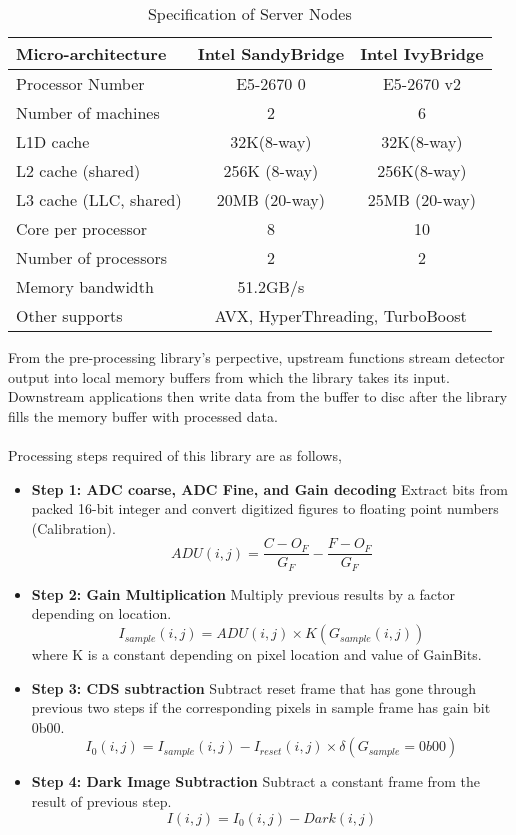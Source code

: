 \documentclass[journal]{IEEEtran}
\begin{document}
\begin{table}[h]
\centering
\label{servers}
\begin{tabular}{l | c c}
\hline
Micro-architecture & Intel SandyBridge & Intel IvyBridge \\
\hline
Processor Number& 	E5-2670 0	& E5-2670 v2 \\
Number of machines&	2		& 6	\\
L1D cache	&	32K(8-way)		& 32K(8-way) \\
L2 cache (shared)  &	256K	(8-way)	& 256K(8-way) \\
L3 cache (LLC, shared)	&	20MB (20-way)	& 25MB (20-way) \\
Core per processor  &	8		& 10	\\
Number of processors  &	2		& 2	\\
Memory bandwidth    &51.2GB/s       & \\
\hline
Other supports  & 
\multicolumn{2}{|c}{AVX, HyperThreading, TurboBoost}  	\\
\hline
\end{tabular}
\caption{Specification of Server Nodes}
\end{table}


From the pre-processing library's perpective, upstream functions stream detector output into local memory buffers from which the library takes its input. Downstream applications then write data from the buffer to disc after the library fills the memory buffer with processed data. \\ \\
Processing steps required of this library are as follows,
\begin{itemize}
 \item \textbf{Step 1: ADC coarse, ADC Fine, and Gain decoding} Extract bits from packed 16-bit integer and convert digitized figures to floating point numbers (Calibration).
	\begin{equation}
		ADU(i,j) = \frac{C - O_F}{G_F} - \frac{F - O_F}{G_F}
	\end{equation}
 \item \textbf{Step 2: Gain Multiplication} Multiply previous results by a factor depending on location.
	\begin{equation}
		I_{sample}(i,j) = ADU(i,j) \times K(G_{sample}(i,j))
	\end{equation}
where K is a constant depending on pixel location and value of GainBits.	
 \item \textbf{Step 3: CDS subtraction} Subtract reset frame that has gone through previous two steps if the corresponding pixels in sample frame has gain bit 0b00.
	\begin{equation}	
		I_0(i,j) = I_{sample}(i,j) - I_{reset}(i,j) \times \delta(G_{sample}=0b00)
	\end{equation}
 \item \textbf{Step 4: Dark Image Subtraction} Subtract a constant frame from the result of previous step.
	\begin{equation}
		I(i,j) = I_0(i,j) - Dark(i,j)
	\end{equation}
\end{itemize}
\end{document}
